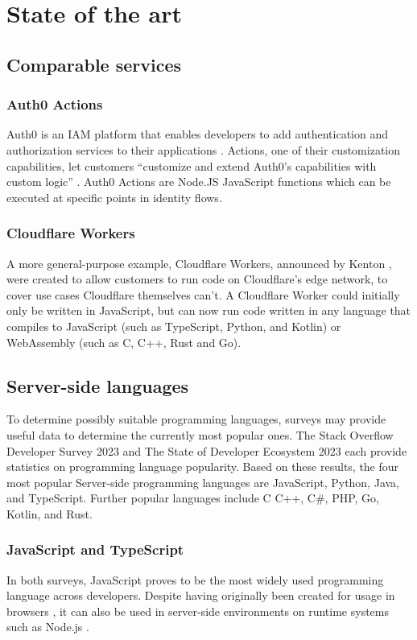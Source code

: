 \section{State of the art}%
\label{sec:state-of-the-art}

\subsection{Comparable services}
\subsubsection{Auth0 Actions}
Auth0 is an IAM platform that enables developers to add authentication and authorization services to their applications \autocite{Auth0Overview}. Actions, one of their customization capabilities, let customers ``customize and extend Auth0's capabilities with custom logic'' \autocite{Auth0Actions}. Auth0 Actions are Node.JS JavaScript functions which can be executed at specific points in identity flows.

\subsubsection{Cloudflare Workers}
A more general-purpose example, Cloudflare Workers, announced by Kenton \textcite{Varda2017}, were created to allow customers to run code on Cloudflare's edge network, to cover use cases Cloudflare themselves can't. A Cloudflare Worker could initially only be written in JavaScript, but can now run code written in any language that compiles to JavaScript (such as TypeScript, Python, and Kotlin) or WebAssembly (such as C, C++, Rust and Go). \autocite{Varda2018, Koeninger2020}

\subsection{Server-side languages}
To determine possibly suitable programming languages, surveys may provide useful data to determine the currently most popular ones. The Stack Overflow Developer Survey 2023 \autocite{StackOverflow2023} and The State of Developer Ecosystem 2023 \autocite{JetBrains2023} each provide statistics on programming language popularity. Based on these results, the four most popular Server-side programming languages are JavaScript, Python, Java, and TypeScript. Further popular languages include   C C++, C\#, PHP, Go, Kotlin, and Rust.

\subsubsection{JavaScript and TypeScript}
In both surveys, JavaScript proves to be the most widely used programming language across developers. Despite having originally been created for usage in browsers \autocite{NCC1995}, it can also be used in server-side environments on runtime systems such as Node.js \autocite{OpenJSFoundation}.

